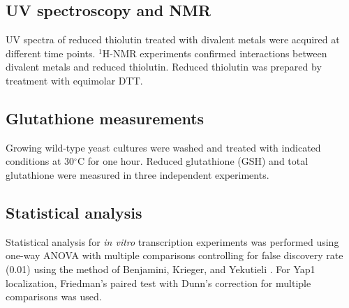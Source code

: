 \documentclass[11pt]{article}
\begin{document}
\subsection{UV spectroscopy and NMR}
UV spectra of reduced thiolutin treated with divalent metals were acquired at different time points. $^1$H-NMR experiments confirmed interactions between divalent metals and reduced thiolutin. Reduced thiolutin was prepared by treatment with equimolar DTT.

\subsection{Glutathione measurements}
Growing wild-type yeast cultures were washed and treated with indicated conditions at 30$^\circ$C for one hour. Reduced glutathione (GSH) and total glutathione were measured in three independent experiments.

\subsection{Statistical analysis}
Statistical analysis for \textit{in vitro} transcription experiments was performed using one-way ANOVA with multiple comparisons controlling for false discovery rate (0.01) using the method of Benjamini, Krieger, and Yekutieli \citep{benjamini1995}. For Yap1 localization, Friedman's paired test with Dunn's correction for multiple comparisons was used.



\end{document}
